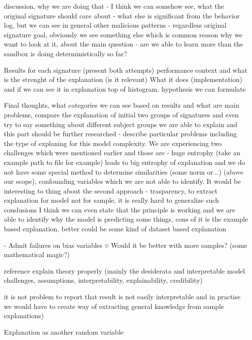discussion, why we are doing that - I think we can somehow see, what the original signature should care about - what else is significant from the behavior log, but we can see in general other malicious patterns - regardless original signature goal, obviously we see something else which is common
reason why we want to look at it, about the main question - are we able to learn more than the sandbox is doing deterministically so far?

Results for each signature (present both attempts)
performance context and what is the strenght of the explanation (is it relevant)
What it does (implementation) and if we can see it in explanation
top of histogram.
hypothesis we can formulate

Final thoughts, what categories we can see based on results and what are main problems, compare the explanation of initial two groups of signatures and even try to say something about different subject groups
we are able to explain and this part should be further researched - describe particular problems including the type of explaning for this model complexity.
We are experiencing two challenges which were mentioned earlier and those are - huge entrophy (take an example path to file for example) leads to big entrophy of explanation and we do not have some special method to determine similarities (some norm or...) (above our scope), confounding variables which we are not able to identify.
It would be interesting to thing about the second approach - trasparency, to extract explanation for model not for sample, it is really hard to generalize such conslusions
I think we can even state that the principle is working and we are able to identify why the model is predicting some things, cons of it is the example based explanation, better could be some kind of dataset based explanation

- Admit failures on bias variables
  ○ Would it be better with more samples? (some mathematical magic?)

  reference explain theory properly (mainly the desiderata and interpretable model challenges, assumptions, interpretability, explainability, credibility)

it is not problem to report that result is not easily interpretable and in practise we would have to create way of extracting general knowledge from sample explanations)

Explanation as another random variable



